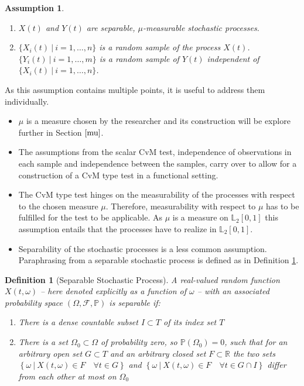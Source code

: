 \documentclass[12pt, a4paper]{article}
\theoremstyle{MAstyle} \newtheorem{assumption}{Assumption}[section]
\theoremstyle{MAstyle} \newtheorem{definition}{Definition}[section]
\theoremstyle{MAstyle} \newtheorem{theorem}{Theorem}[section]
\begin{document}
			\newpage
			\begin{assumption}\label{Ass1}\hfill\vspace{-0.8cm}
				\begin{enumerate}
					\item $X(t)$ and $Y(t)$ are separable, $\mu$-measurable stochastic processes. 
					\item $\{X_i(t) \: \vert \: i = 1, \dots, n\}$ is a random sample of the process $X(t)$. \\
					$\{Y_i(t) \: \vert \: i = 1, \dots, m\}$ is a random sample of $Y(t)$ independent of $\{X_i(t) \: \vert \: i = 1, \dots, n\}$.
				\end{enumerate}
			\end{assumption}
		As this assumption contains multiple points, it is useful to address them individually.
			\begin{itemize}
				\item $\mu$ is a measure chosen by the researcher and its construction will be explore further in Section $\ref{mu}$.
				\item The assumptions from the scalar CvM test, independence of observations in each sample and independence between the samples, carry over to allow for a construction of a CvM type test in a functional setting. 
				\item The CvM type test hinges on the measurability of the processes with respect to the chosen measure $\mu$. Therefore, measurability with respect to $\mu$ has to be fulfilled for the test to be applicable. As $\mu$ is a measure on $\mathbb{L}_2[0,1]$ this assumption entails that the processes have to realize in $\mathbb{L}_2[0,1]$.
				\item Separability of the stochastic processes is a less common assumption. Paraphrasing from \cite{gihman_theory_2004} a separable stochastic process is defined as in Definition \ref{separability}.
			\end{itemize}
			\begin{definition}[Separable Stochastic Process]\label{separability}
				A real-valued random function $X(t, \omega)$ -- here denoted explicitly as a function of $\omega$ -- with an associated probability space $\left(\Omega, \mathcal{F}, \mathbb{P}\right)$ is separable if:
				\begin{enumerate}
					\item There is a dense countable subset $I \subset T$ of its index set $T$
					\item There is a set $\Omega_0 \subset \Omega$ of probability zero, so $\mathbb{P}\left(\Omega_0\right) = 0$, such that for an arbitrary open set $G \subset T$ and an arbitrary closed set $F \subset \mathbb{R}$ the two sets $\left\{\omega \ \vert \ X(t, \omega) \in F \quad \forall t \in G\right\}$ and $\left\{\omega \ \vert \ X(t, \omega) \in F \quad \forall t \in G \cap I\right\}$ differ from each other at most on $\Omega_0$
				\end{enumerate}      
			\end{definition}
\end{document}
